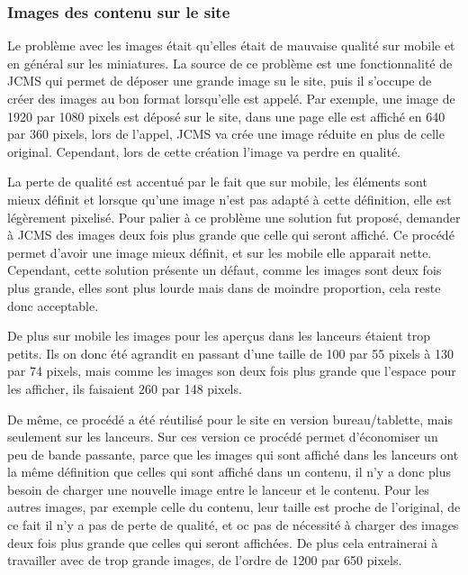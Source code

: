 \documentclass[12pt,a4paper]{article}
\begin{document}
\subsubsection{Images des contenu sur le site}
Le problème avec les images était qu'elles était de mauvaise qualité sur mobile et en général sur les miniatures. La source de ce problème est une fonctionnalité de JCMS qui permet de déposer une grande image su le site, puis il s'occupe de créer des images au bon format lorsqu'elle est appelé. Par exemple, une image de 1920 par 1080 pixels est déposé sur le site, dans une page elle est affiché en 640 par 360 pixels, lors de l'appel, JCMS va crée une image réduite en plus de celle original. Cependant, lors de cette création l'image va perdre en qualité.\par
La perte de qualité est accentué par le fait que sur mobile, les éléments sont mieux définit et lorsque qu'une image n'est pas adapté à cette définition, elle est légèrement pixelisé. Pour palier à ce problème une solution fut proposé, demander à JCMS des images deux fois plus grande que celle qui seront affiché. Ce procédé permet d'avoir une image mieux définit, et sur les mobile elle apparait nette. Cependant, cette solution présente un défaut, comme les images sont deux fois plus grande, elles sont plus lourde mais dans de moindre proportion, cela reste donc acceptable.\par
De plus sur mobile les images pour les aperçus dans les lanceurs étaient trop petits. Ils on donc été agrandit en passant d'une taille de 100 par 55 pixels à 130 par 74 pixels, mais comme les images son deux fois plus grande que l'espace pour les afficher, ils faisaient 260 par 148 pixels.\par 
De même, ce procédé a été réutilisé pour le site en version bureau/tablette, mais seulement sur les lanceurs. Sur ces version ce procédé permet d'économiser un peu de bande passante, parce que les images qui sont affiché dans les lanceurs ont la même définition que celles qui sont affiché dans un contenu, il n'y a donc plus besoin de charger une nouvelle image entre le lanceur et le contenu. Pour les autres images, par exemple celle du contenu, leur taille est proche de l'original, de ce fait il n'y a pas de perte de qualité, et oc pas de nécessité à charger des images deux fois plus grande que celles qui seront affichées. De plus cela entrainerai à travailler avec de trop grande images, de l'ordre de 1200 par 650 pixels.\par
\end{document}
